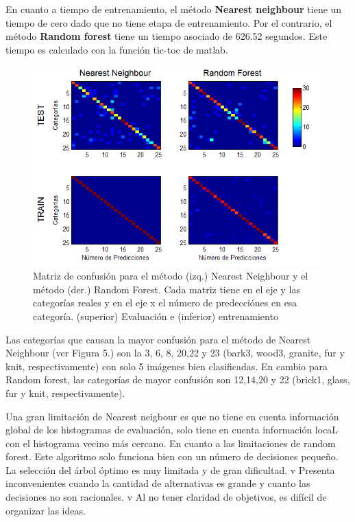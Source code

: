 \documentclass[10pt,twocolumn,letterpaper]{article}
\begin{document}
En cuanto a tiempo de entrenamiento, el método \textbf{Nearest neighbour} tiene un tiempo de cero dado que no tiene etapa de entrenamiento. Por el contrario, el método \textbf{Random forest} tiene un tiempo asociado de 626.52 segundos. Este tiempo es calculado con la función tic-toc de matlab. 

\begin{figure}[htb]

\includegraphics[width=7in]{Matriz_Confusi_n.png}
   \caption{Matriz de confusión para el método (izq.) Nearest Neighbour y el método (der.) Random Forest. Cada matriz tiene en el eje y las categorías reales y en el eje x el número de predecciónes en esa categoría. (superior) Evaluación e (inferior) entrenamiento}
\end{figure}

Las categorías que causan la mayor confusión  para el método de Nearest Neighbour (ver Figura 5.) son la 3, 6, 8, 20,22 y 23 (bark3, wood3, granite, fur y knit, respectivamente) con solo 5 imágenes bien clasificadas. En cambio para Random forest, las categorías de mayor confusión son 12,14,20 y 22 (brick1, glass, fur y knit, respectivamente). 

Una gran limitación de Nearest neigbour es que no tiene en cuenta información global de los histogramas de evaluación, solo tiene en cuenta información locaL con el histograma vecino más cercano.  
En cuanto a las limitaciones de random forest. Este algoritmo solo funciona bien con un número de decisiones pequeño. La selección del árbol óptimo es muy limitada y de gran dificultad. 
v Presenta inconvenientes cuando la cantidad de alternativas es grande y cuanto las decisiones no son racionales.
v Al no tener claridad de objetivos, es difícil de organizar las ideas. 
\end{document}

